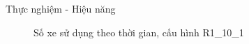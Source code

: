 
\begin{frame}{Thực nghiệm - Hiệu năng}
  \begin{figure}
    \centering
    \quad
  \caption{Số xe sử dụng theo thời gian, cấu hình R1\_10\_1}
  \end{figure}
\end{frame}



